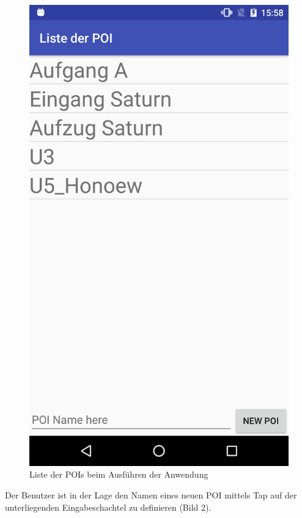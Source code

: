 \documentclass{article}
\begin{document}
\begin{figure}[H]
	\centering
	\includegraphics[scale=0.18]{images/poi_list_begin.png}
	\caption{Liste der POIs beim Ausführen der Anwendung}
	\label{fig:poi_list_begin}
\end{figure}

Der Benutzer ist in der Lage den Namen eines neuen POI mittels Tap auf der unterliegenden Eingabeschachtel zu definieren (Bild 2). 
\end{document}
